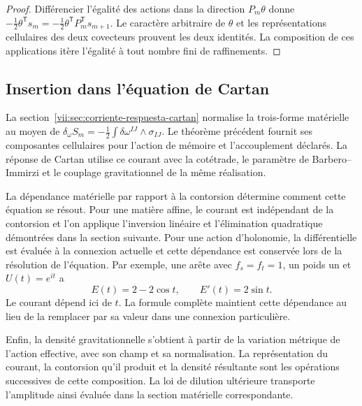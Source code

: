 \begin{proof}
Différencier l'égalité des actions dans la direction
\(P_m\theta\) donne
\(-\tfrac12\theta^{\mathsf T}s_m
 =-\tfrac12\theta^{\mathsf T}P_m^{\mathsf T}s_{m+1}\).
Le caractère arbitraire de \(\theta\) et les représentations cellulaires
des deux covecteurs prouvent les deux identités. La composition de
ces applications itère l'égalité à tout nombre fini de raffinements.
\end{proof}

\subsection{Insertion dans l'équation de Cartan}

La section~\ref{vii:sec:corriente-respuesta-cartan} normalise la trois-forme matérielle au moyen de \(\delta_\omega S_m=-\tfrac12\int\delta\omega^{IJ}\wedge
\sigma_{IJ}\). Le théorème précédent fournit ses composantes cellulaires pour l'action de mémoire et l'accouplement déclarés. La réponse de Cartan utilise ce courant avec la cotétrade, le paramètre de Barbero--Immirzi et le couplage gravitationnel de la même réalisation.

La dépendance matérielle par rapport à la contorsion détermine comment
cette équation se résout. Pour une matière affine, le courant est indépendant
de la contorsion et l’on applique l’inversion linéaire et l’élimination
quadratique démontrées dans la section suivante. Pour une action
d’holonomie, la différentielle est évaluée à la connexion actuelle et cette
dépendance est conservée lors de la résolution de l’équation. Par exemple, une arête avec
\(f_s=f_t=1\), un poids un et \(U(t)=e^{it}\) a
\[
 E(t)=2-2\cos t,\qquad E'(t)=2\sin t.
\]
Le courant dépend ici de \(t\). La formule complète maintient
cette dépendance au lieu de la remplacer par sa valeur dans une connexion
particulière.

Enfin, la densité gravitationnelle s'obtient à partir de la variation
métrique de l'action effective, avec son champ et sa normalisation.
La représentation du courant, la contorsion qu'il produit et la
densité résultante sont les opérations successives de cette composition.
La loi de dilution ultérieure transporte l'amplitude ainsi évaluée dans
la section matérielle correspondante.
